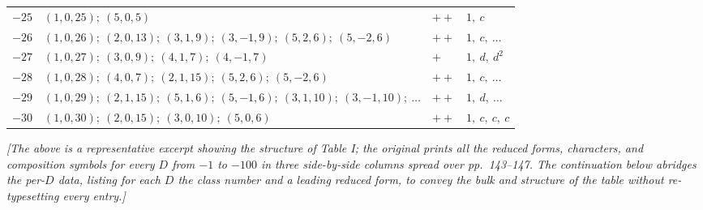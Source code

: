 \documentclass[11pt,a4paper]{article}
\theoremstyle{plain}
\begin{document}
\begin{longtable}{r|p{}|l|l}
$-25$ & $(1,0,25);\ (5,0,5)$ & $++$ & $1,\ c$ \\
$-26$ & $(1,0,26);\ (2,0,13);\ (3,1,9);\ (3,-1,9);\ (5,2,6);\ (5,-2,6)$ & $++$ & $1,\ c,\ \ldots$ \\
$-27$ & $(1,0,27);\ (3,0,9);\ (4,1,7);\ (4,-1,7)$ & $+$ & $1,\ d,\ d^{2}$ \\
$-28$ & $(1,0,28);\ (4,0,7);\ (2,1,15);\ (5,2,6);\ (5,-2,6)$ & $++$ & $1,\ c,\ \ldots$ \\
$-29$ & $(1,0,29);\ (2,1,15);\ (5,1,6);\ (5,-1,6);\ (3,1,10);\ (3,-1,10);\ \ldots$ & $++$ & $1,\ d,\ \ldots$ \\
$-30$ & $(1,0,30);\ (2,0,15);\ (3,0,10);\ (5,0,6)$ & $++$ & $1,\ c,\ c,\ c$ \\
\end{longtable}

\noindent\textit{[The above is a representative excerpt showing the structure of Table I; the original prints all the reduced forms, characters, and composition symbols for every $D$ from $-1$ to $-100$ in three side-by-side columns spread over pp.~143--147. The continuation below abridges the per-$D$ data, listing for each $D$ the class number and a leading reduced form, to convey the bulk and structure of the table without re-typesetting every entry.]}
\end{document}
